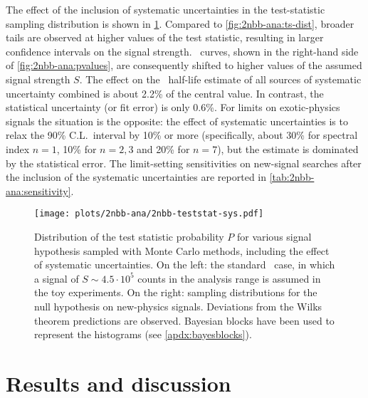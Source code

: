 The effect of the inclusion of systematic uncertainties in the test-statistic sampling
distribution is shown in \cref{fig:2nbb-ana:ts-dist-sys}. Compared to
\cref{fig:2nbb-ana:ts-dist}, broader tails are observed at higher values of the test
statistic, resulting in larger confidence intervals on the signal strength. \pvalue\
curves, shown in the right-hand side of \cref{fig:2nbb-ana:pvalues}, are consequently
shifted to higher values of the assumed signal strength $S$. The effect on the \nnbb\
half-life estimate of all sources of systematic uncertainty combined is about 2.2\% of the
central value. In contrast, the statistical uncertainty (or fit error) is only 0.6\%. For
limits on exotic-physics signals the situation is the opposite: the effect of systematic
uncertainties is to relax the 90\% C.L.~interval by 10\% or more (specifically, about 30\%
for spectral index $n=1$, 10\% for $n=2,3$ and 20\% for $n=7$), but the estimate is
dominated by the statistical error. The limit-setting sensitivities on new-signal searches
after the inclusion of the systematic uncertainties are reported in
\cref{tab:2nbb-ana:sensitivity}.

\begin{figure}
  \centering
  \texttt{[image: plots/2nbb-ana/2nbb-teststat-sys.pdf]}
  \caption{%
    Distribution of the test statistic probability $P$ for various signal hypothesis
    sampled with Monte Carlo methods, including the effect of systematic uncertainties. On
    the left: the standard \nnbb\ case, in which a signal of $S \sim 4.5 \cdot 10^5$
    counts in the analysis range is assumed in the toy experiments. On the right: sampling
    distributions for the null hypothesis on new-physics signals.  Deviations from the
    Wilks theorem predictions are observed. Bayesian blocks have been used to represent
    the histograms (see \cref{apdx:bayesblocks}).
  }\label{fig:2nbb-ana:ts-dist-sys}
\end{figure}

%   

\section{Results and discussion}%
\label{sec:2nbb-ana:results}

